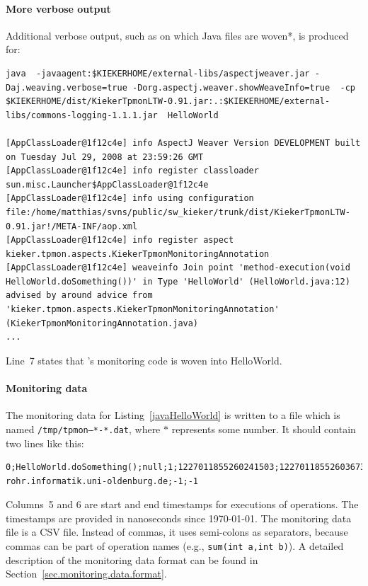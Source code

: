\documentclass[a4paper,12pt]{scrartcl}
\begin{document}
\paragraph{More verbose output}
Additional verbose output, such as on which Java files are woven*, is produced for:
\begin{lstlisting}[caption={Verbose execution with AspectJ's Java agent.},label={lst2},language=clean,basicstyle=\ttfamily\footnotesize,keywordstyle=\ttfamily\footnotesize]
java  -javaagent:$KIEKERHOME/external-libs/aspectjweaver.jar -Daj.weaving.verbose=true -Dorg.aspectj.weaver.showWeaveInfo=true  -cp $KIEKERHOME/dist/KiekerTpmonLTW-0.91.jar:.:$KIEKERHOME/external-libs/commons-logging-1.1.1.jar  HelloWorld

[AppClassLoader@1f12c4e] info AspectJ Weaver Version DEVELOPMENT built on Tuesday Jul 29, 2008 at 23:59:26 GMT
[AppClassLoader@1f12c4e] info register classloader sun.misc.Launcher$AppClassLoader@1f12c4e
[AppClassLoader@1f12c4e] info using configuration file:/home/matthias/svns/public/sw_kieker/trunk/dist/KiekerTpmonLTW-0.91.jar!/META-INF/aop.xml
[AppClassLoader@1f12c4e] info register aspect kieker.tpmon.aspects.KiekerTpmonMonitoringAnnotation
[AppClassLoader@1f12c4e] weaveinfo Join point 'method-execution(void HelloWorld.doSomething())' in Type 'HelloWorld' (HelloWorld.java:12) advised by around advice from 'kieker.tpmon.aspects.KiekerTpmonMonitoringAnnotation' (KiekerTpmonMonitoringAnnotation.java)
...
\end{lstlisting}
Line~7 states that \tpmon{}'s monitoring code is woven into HelloWorld.

\paragraph{Monitoring data}
The monitoring data for Listing~\ref{javaHelloWorld} is written to a file which is named \texttt{/tmp/tpmon--*-*.dat}, where $*$ represents some number. It should contain two lines like this:
\begin{lstlisting}[caption={Example monitoring data},label={OutputHelloWorld2},language=clean,basicstyle=\ttfamily\footnotesize,keywordstyle=\ttfamily\footnotesize]
0;HelloWorld.doSomething();null;1;1227011855260241503;1227011855260367357;pc-rohr.informatik.uni-oldenburg.de;-1;-1
\end{lstlisting}

Columns~5 and 6 are start and end timestamps for executions of operations. The timestamps are provided in nanoseconds since 1970-01-01. The monitoring data file is a CSV file. Instead of commas, it uses semi-colons as separators, because commas can be part of operation names (e.g., \texttt{sum(int a,int b)}). A detailed description of the monitoring data format can be found in Section~\ref{sec.monitoring.data.format}.
\end{document}
